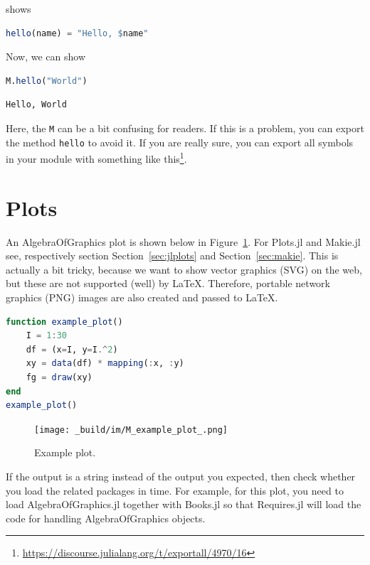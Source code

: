 \documentclass[
  notoc %
]{tufte-book}
\DeclareRobustCommand{\href}[2]{#2\footnote{\url{#1}}}
\newcommand{\passthrough}[1]{#1}
\begin{document}
shows

\begin{lstlisting}[language=Julia]
hello(name) = "Hello, $name"
\end{lstlisting}

Now, we can show

\begin{lstlisting}[language=Julia]
M.hello("World")
\end{lstlisting}

\begin{lstlisting}[language=Output]
Hello, World
\end{lstlisting}

Here, the \passthrough{\lstinline!M!} can be a bit confusing for
readers. If this is a problem, you can export the method
\passthrough{\lstinline!hello!} to avoid it. If you are really sure, you
can export all symbols in your module with something like
\href{https://discourse.julialang.org/t/exportall/4970/16}{this}.

\hypertarget{sec:plots}{%
\section{Plots}\label{sec:plots}}

An AlgebraOfGraphics plot is shown below in
Figure~\ref{fig:example_plot}. For Plots.jl and Makie.jl see,
respectively section Section~\ref{sec:jlplots} and
Section~\ref{sec:makie}. This is actually a bit tricky, because we want
to show vector graphics (SVG) on the web, but these are not supported
(well) by LaTeX. Therefore, portable network graphics (PNG) images are
also created and passed to LaTeX.

\begin{lstlisting}[language=Julia]
function example_plot()
    I = 1:30
    df = (x=I, y=I.^2)
    xy = data(df) * mapping(:x, :y)
    fg = draw(xy)
end
example_plot()
\end{lstlisting}

\begin{figure}
\hypertarget{fig:example_plot}{%
\centering
\texttt{[image: \_build/im/M\_example\_plot\_.png]}
\caption{Example plot.}\label{fig:example_plot}
}
\end{figure}

If the output is a string instead of the output you expected, then check
whether you load the related packages in time. For example, for this
plot, you need to load AlgebraOfGraphics.jl together with Books.jl so
that Requires.jl will load the code for handling AlgebraOfGraphics
objects.
\end{document}
